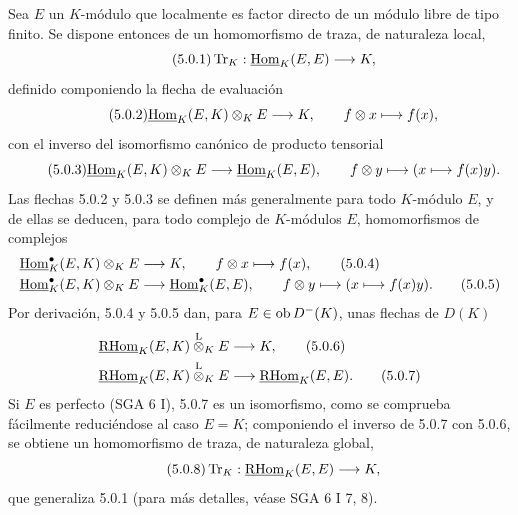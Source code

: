 Sea $E$ un $K$-módulo que localmente es factor directo de un módulo libre de tipo finito. Se dispone entonces de un homomorfismo de traza, de naturaleza local,
\begin{equation}\tag{5.0.1}
\operatorname{Tr}_K:\underline{\operatorname{Hom}}_K(E,E)\longrightarrow K,
\end{equation}
definido componiendo la flecha de evaluación
\begin{equation}\tag{5.0.2}
\underline{\operatorname{Hom}}_K(E,K)\otimes_KE\longrightarrow K,\qquad f\otimes x\longmapsto f(x),
\end{equation}
con el inverso del isomorfismo canónico de producto tensorial
\begin{equation}\tag{5.0.3}
\underline{\operatorname{Hom}}_K(E,K)\otimes_KE\longrightarrow\underline{\operatorname{Hom}}_K(E,E),\qquad f\otimes y\longmapsto (x\longmapsto f(x)y).
\end{equation}
Las flechas 5.0.2 y 5.0.3 se definen más generalmente para todo $K$-módulo $E$, y de ellas se deducen, para todo complejo de $K$-módulos $E$, homomorfismos de complejos
\begin{align}
\underline{\operatorname{Hom}}_K^\bullet(E,K)\otimes_KE&\longrightarrow K,\qquad f\otimes x\longmapsto f(x),\tag{5.0.4}\\
\underline{\operatorname{Hom}}_K^\bullet(E,K)\otimes_KE&\longrightarrow \underline{\operatorname{Hom}}_K^\bullet(E,E),\qquad f\otimes y\longmapsto (x\longmapsto f(x)y).\tag{5.0.5}
\end{align}
Por derivación, 5.0.4 y 5.0.5 dan, para $E\in\operatorname{ob} D^-(K)$, unas flechas de $D(K)$
\begin{align}
\underline{\mathrm{RHom}}_K(E,K)\overset{\mathrm L}{\otimes}_KE&\longrightarrow K,\tag{5.0.6}\\
\underline{\mathrm{RHom}}_K(E,K)\overset{\mathrm L}{\otimes}_KE&\longrightarrow\underline{\mathrm{RHom}}_K(E,E).\tag{5.0.7}
\end{align}
Si $E$ es perfecto (SGA 6 I), 5.0.7 es un isomorfismo, como se comprueba fácilmente reduciéndose al caso $E=K$; componiendo el inverso de 5.0.7 con 5.0.6, se obtiene un homomorfismo de traza, de naturaleza global,
\begin{equation}\tag{5.0.8}
\operatorname{Tr}_K:\underline{\mathrm{RHom}}_K(E,E)\longrightarrow K,
\end{equation}
que generaliza 5.0.1 (para más detalles, véase SGA 6 I 7, 8).
